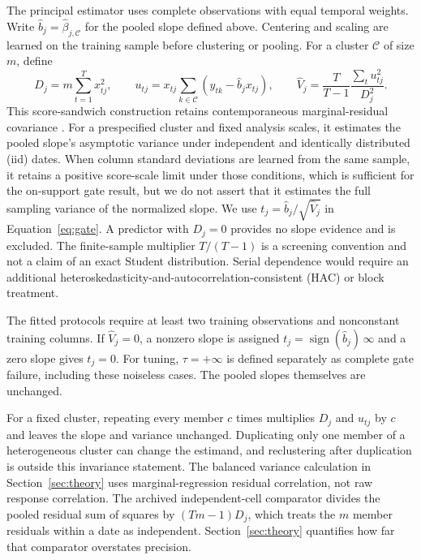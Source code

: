\documentclass[lineno,pdflatex,sn-basic]{sn-jnl}
\theoremstyle{thmstyleone}
\begin{document}
The principal estimator uses complete observations with equal temporal weights.
Write $\widehat b_j=\hat\beta_{j,\mathcal C}$ for the pooled slope defined above.
Centering and scaling are learned on the training sample before clustering or
pooling. For a cluster $\mathcal C$ of size $m$, define
\begin{equation}
D_j=m\sum_{t=1}^T x_{tj}^2,\qquad
u_{tj}=x_{tj}\sum_{k\in\mathcal C}(y_{tk}-\widehat b_jx_{tj}),\qquad
\widehat V_j=\frac{T}{T-1}\frac{\sum_tu_{tj}^2}{D_j^2}.
\label{eq:date-score}
\end{equation}
This score-sandwich construction retains contemporaneous marginal-residual
covariance \citep{White:1980,Liang+Zeger:1986,CameronMiller2015}. For a
prespecified cluster and fixed analysis scales, it estimates the pooled slope's
asymptotic variance under independent and identically distributed (iid) dates.
When column standard deviations are learned from the same sample, it retains a
positive score-scale limit under those conditions, which is sufficient for the
on-support gate result, but we do not assert that it estimates the full sampling
variance of the normalized slope. We use $t_j=\widehat b_j/\sqrt{\widehat V_j}$
in Equation~\eqref{eq:gate}. A predictor with $D_j=0$ provides no slope evidence
and is excluded. The finite-sample multiplier $T/(T-1)$ is a screening
convention and not a claim of an exact Student distribution. Serial dependence
would require an additional heteroskedasticity-and-autocorrelation-consistent
(HAC) or block treatment.

The fitted protocols require at least two training observations and nonconstant
training columns. If $\widehat V_j=0$, a nonzero slope is assigned
$t_j=\operatorname{sign}(\widehat b_j)\,\infty$ and a zero slope gives $t_j=0$.
For tuning, $\tau=+\infty$ is defined separately as complete gate failure,
including these noiseless cases. The pooled slopes themselves are unchanged.

For a fixed cluster, repeating every member $c$ times multiplies $D_j$ and
$u_{tj}$ by $c$ and leaves the slope and variance unchanged. Duplicating only
one member of a heterogeneous cluster can change the estimand, and reclustering
after duplication is outside this invariance statement. The balanced
variance calculation in Section~\ref{sec:theory} uses marginal-regression
residual correlation, not raw response correlation. The archived
independent-cell comparator divides the pooled residual sum of squares by
$(Tm-1)D_j$, which treats the $m$ member residuals within a date as
independent. Section~\ref{sec:theory} quantifies how far that comparator
overstates precision.
\end{document}
